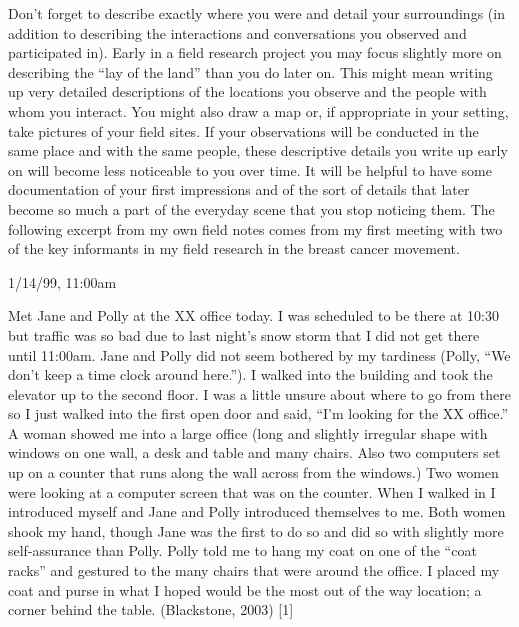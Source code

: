 Don’t forget to describe exactly where you were and detail your surroundings (in addition to describing the interactions and conversations you observed and participated in). Early in a field research project you may focus slightly more on describing the “lay of the land” than you do later on. This might mean writing up very detailed descriptions of the locations you observe and the people with whom you interact. You might also draw a map or, if appropriate in your setting, take pictures of your field sites. If your observations will be conducted in the same place and with the same people, these descriptive details you write up early on will become less noticeable to you over time. It will be helpful to have some documentation of your first impressions and of the sort of details that later become so much a part of the everyday scene that you stop noticing them. The following excerpt from my own field notes comes from my first meeting with two of the key informants in my field research in the breast cancer movement.

1/14/99, 11:00am

Met Jane and Polly at the XX office today. I was scheduled to be there at 10:30 but traffic was so bad due to last night’s snow storm that I did not get there until 11:00am. Jane and Polly did not seem bothered by my tardiness (Polly, “We don’t keep a time clock around here.”). I walked into the building and took the elevator up to the second floor. I was a little unsure about where to go from there so I just walked into the first open door and said, “I’m looking for the XX office.” A woman showed me into a large office (long and slightly irregular shape with windows on one wall, a desk and table and many chairs. Also two computers set up on a counter that runs along the wall across from the windows.) Two women were looking at a computer screen that was on the counter. When I walked in I introduced myself and Jane and Polly introduced themselves to me. Both women shook my hand, though Jane was the first to do so and did so with slightly more self-assurance than Polly. Polly told me to hang my coat on one of the “coat racks” and gestured to the many chairs that were around the office. I placed my coat and purse in what I hoped would be the most out of the way location; a corner behind the table. (Blackstone, 2003) [1]

